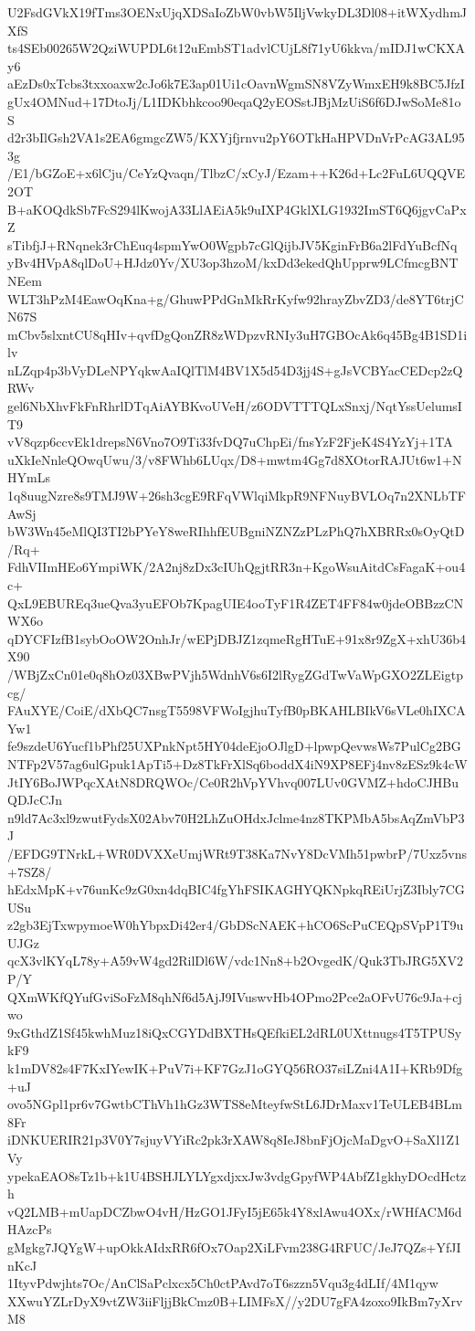 U2FsdGVkX19fTms3OENxUjqXDSaIoZbW0vbW5IljVwkyDL3Dl08+itWXydhmJXfS
ts4SEb00265W2QziWUPDL6t12uEmbST1advlCUjL8f71yU6kkva/mIDJ1wCKXAy6
aEzDs0xTcbs3txxoaxw2cJo6k7E3ap01Ui1cOavnWgmSN8VZyWmxEH9k8BC5JfzI
gUx4OMNud+17DtoJj/L1IDKbhkcoo90eqaQ2yEOSstJBjMzUiS6f6DJwSoMe81oS
d2r3bIlGsh2VA1s2EA6gmgcZW5/KXYjfjrnvu2pY6OTkHaHPVDnVrPcAG3AL953g
/E1/bGZoE+x6lCju/CeYzQvaqn/TlbzC/xCyJ/Ezam++K26d+Lc2FuL6UQQVE2OT
B+aKOQdkSb7FcS294lKwojA33LlAEiA5k9uIXP4GklXLG1932ImST6Q6jgvCaPxZ
sTibfjJ+RNqnek3rChEuq4spmYwO0Wgpb7cGlQijbJV5KginFrB6a2lFdYuBcfNq
yBv4HVpA8qlDoU+HJdz0Yv/XU3op3hzoM/kxDd3ekedQhUpprw9LCfmcgBNTNEem
WLT3hPzM4EawOqKna+g/GhuwPPdGnMkRrKyfw92hrayZbvZD3/de8YT6trjCN67S
mCbv5slxntCU8qHIv+qvfDgQonZR8zWDpzvRNIy3uH7GBOcAk6q45Bg4B1SD1ilv
nLZqp4p3bVyDLeNPYqkwAaIQlTlM4BV1X5d54D3jj4S+gJsVCBYacCEDcp2zQRWv
gel6NbXhvFkFnRhrlDTqAiAYBKvoUVeH/z6ODVTTTQLxSnxj/NqtYssUelumsIT9
vV8qzp6ccvEk1drepsN6Vno7O9Ti33fvDQ7uChpEi/fnsYzF2FjeK4S4YzYj+1TA
uXkIeNnleQOwqUwu/3/v8FWhb6LUqx/D8+mwtm4Gg7d8XOtorRAJUt6w1+NHYmLs
1q8uugNzre8s9TMJ9W+26sh3cgE9RFqVWlqiMkpR9NFNuyBVLOq7n2XNLbTFAwSj
bW3Wn45eMlQI3TI2bPYeY8weRIhhfEUBgniNZNZzPLzPhQ7hXBRRx0sOyQtD/Rq+
FdhVIImHEo6YmpiWK/2A2nj8zDx3cIUhQgjtRR3n+KgoWsuAitdCsFagaK+ou4c+
QxL9EBUREq3ueQva3yuEFOb7KpagUIE4ooTyF1R4ZET4FF84w0jdeOBBzzCNWX6o
qDYCFIzfB1sybOoOW2OnhJr/wEPjDBJZ1zqmeRgHTuE+91x8r9ZgX+xhU36b4X90
/WBjZxCn01e0q8hOz03XBwPVjh5WdnhV6s6I2lRygZGdTwVaWpGXO2ZLEigtpcg/
FAuXYE/CoiE/dXbQC7nsgT5598VFWoIgjhuTyfB0pBKAHLBIkV6sVLe0hIXCAYw1
fe9szdeU6Yucf1bPhf25UXPnkNpt5HY04deEjoOJlgD+lpwpQevwsWs7PulCg2BG
NTFp2V57ag6ulGpuk1ApTi5+Dz8TkFrXlSq6boddX4iN9XP8EFj4nv8zESz9k4cW
JtIY6BoJWPqcXAtN8DRQWOc/Ce0R2hVpYVhvq007LUv0GVMZ+hdoCJHBuQDJcCJn
n9ld7Ac3xl9zwutFydsX02Abv70H2LhZuOHdxJclme4nz8TKPMbA5bsAqZmVbP3J
/EFDG9TNrkL+WR0DVXXeUmjWRt9T38Ka7NvY8DcVMh51pwbrP/7Uxz5vns+7SZ8/
hEdxMpK+v76unKc9zG0xn4dqBIC4fgYhFSIKAGHYQKNpkqREiUrjZ3Ibly7CGUSu
z2gb3EjTxwpymoeW0hYbpxDi42er4/GbDScNAEK+hCO6ScPuCEQpSVpP1T9uUJGz
qcX3vlKYqL78y+A59vW4gd2RilDl6W/vdc1Nn8+b2OvgedK/Quk3TbJRG5XV2P/Y
QXmWKfQYufGviSoFzM8qhNf6d5AjJ9IVuswvHb4OPmo2Pce2aOFvU76c9Ja+cjwo
9xGthdZ1Sf45kwhMuz18iQxCGYDdBXTHsQEfkiEL2dRL0UXttnugs4T5TPUSykF9
k1mDV82s4F7KxIYewIK+PuV7i+KF7GzJ1oGYQ56RO37siLZni4A1I+KRb9Dfg+uJ
ovo5NGpl1pr6v7GwtbCThVh1hGz3WTS8eMteyfwStL6JDrMaxv1TeULEB4BLm8Fr
iDNKUERIR21p3V0Y7sjuyVYiRc2pk3rXAW8q8IeJ8bnFjOjcMaDgvO+SaXl1Z1Vy
ypekaEAO8sTz1b+k1U4BSHJLYLYgxdjxxJw3vdgGpyfWP4AbfZ1gkhyDOcdHctzh
vQ2LMB+mUapDCZbwO4vH/HzGO1JFyI5jE65k4Y8xlAwu4OXx/rWHfACM6dHAzcPs
gMgkg7JQYgW+upOkkAIdxRR6fOx7Oap2XiLFvm238G4RFUC/JeJ7QZs+YfJInKcJ
1ItyvPdwjhts7Oc/AnClSaPclxcx5Ch0ctPAvd7oT6szzn5Vqu3g4dLIf/4M1qyw
XXwuYZLrDyX9vtZW3iiFljjBkCmz0B+LIMFsX//y2DU7gFA4zoxo9IkBm7yXrvM8
